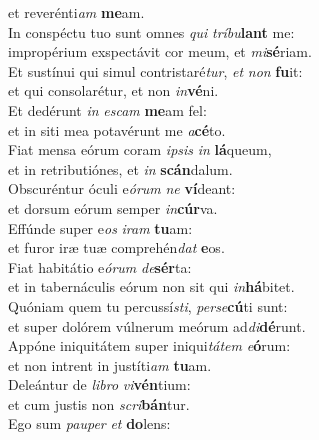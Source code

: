 \oddverse et reverénti\textit{am} \textbf{me}am.\\
\evenverse In conspéctu tuo sunt omnes \textit{qui} \textit{trí}\textit{bu}\textbf{lant} me:~\*\\
\evenverse impropérium exspectávit cor meum, et \textit{mi}\textbf{sé}riam.\\
\oddverse Et sustínui qui simul contristaré\textit{tur}, \textit{et} \textit{non} \textbf{fu}it:~\*\\
\oddverse et qui consolarétur, et non \textit{in}\textbf{vé}ni.\\
\evenverse Et dedérunt \textit{in} \textit{e}\textit{scam} \textbf{me}am fel:~\*\\
\evenverse et in siti mea potavérunt me \textit{a}\textbf{cé}to.\\
\oddverse Fiat mensa eórum coram \textit{i}\textit{psis} \textit{in} \textbf{lá}queum,~\*\\
\oddverse et in retributiónes, et \textit{in} \textbf{scán}dalum.\\
\evenverse Obscuréntur óculi e\textit{ó}\textit{rum} \textit{ne} \textbf{ví}deant:~\*\\
\evenverse et dorsum eórum semper \textit{in}\textbf{cúr}va.\\
\oddverse Effúnde super e\textit{os} \textit{i}\textit{ram} \textbf{tu}am:~\*\\
\oddverse et furor iræ tuæ comprehén\textit{dat} \textbf{e}os.\\
\evenverse Fiat habitátio e\textit{ó}\textit{rum} \textit{de}\textbf{sér}ta:~\*\\
\evenverse et in tabernáculis eórum non sit qui \textit{in}\textbf{há}bitet.\\
\oddverse Quóniam quem tu percussí\textit{sti}, \textit{per}\textit{se}\textbf{cú}ti sunt:~\*\\
\oddverse et super dolórem vúlnerum meórum ad\textit{di}\textbf{dé}runt.\\
\evenverse Appóne iniquitátem super iniqui\textit{tá}\textit{tem} \textit{e}\textbf{ó}rum:~\*\\
\evenverse et non intrent in justíti\textit{am} \textbf{tu}am.\\
\oddverse Deleántur de \textit{li}\textit{bro} \textit{vi}\textbf{vén}tium:~\*\\
\oddverse et cum justis non \textit{scri}\textbf{bán}tur.\\
\evenverse Ego sum \textit{pau}\textit{per} \textit{et} \textbf{do}lens:~\*\\

